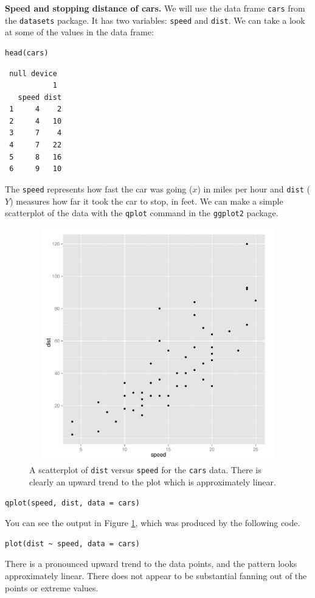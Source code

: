 \documentclass[captions=tableheading]{scrbook}
\begin{document}
\begin{example}
\label{exa:Speed-and-Stopping}
\textbf{Speed and stopping distance of cars.} We will use the data frame \texttt{cars} from the \texttt{datasets} package. It has two variables: \texttt{speed} and \texttt{dist}. We can take a look at some of the values in the data frame: 

\begin{verbatim}
head(cars)
\end{verbatim}

\begin{verbatim}
 null device 
           1
   speed dist
 1     4    2
 2     4   10
 3     7    4
 4     7   22
 5     8   16
 6     9   10
\end{verbatim}

The \texttt{speed} represents how fast the car was going (\(x\)) in miles per hour and \texttt{dist} (\(Y\)) measures how far it took the car to stop, in feet. We can make a simple scatterplot of the data with the \texttt{qplot} command in the \texttt{ggplot2} package. 

\begin{figure}[th]
  \includegraphics[width=5in, height=4in]{img/carscatter.pdf}
  \caption[Scatterplot of \texttt{dist} versus \texttt{speed} for the \texttt{cars} data]{\small A scatterplot of \texttt{dist} versus \texttt{speed} for the \texttt{cars} data.  There is clearly an upward trend to the plot which is approximately linear.}
  \label{fig:Scatter-cars}
\end{figure}


\begin{verbatim}
qplot(speed, dist, data = cars)
\end{verbatim}

You can see the output in Figure \ref{fig:Scatter-cars}, which was produced by the following code.


\begin{verbatim}
plot(dist ~ speed, data = cars)
\end{verbatim}

There is a pronounced upward trend to the data points, and the pattern looks approximately linear. There does not appear to be substantial fanning out of the points or extreme values. 
\end{example}
\end{document}
